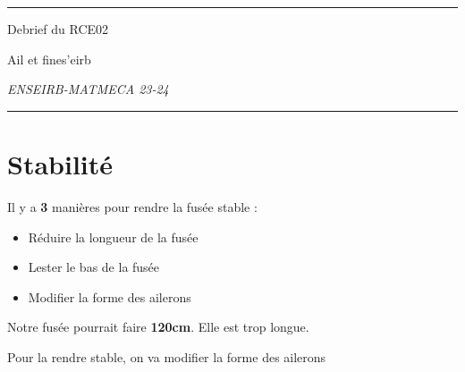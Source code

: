 \documentclass[6pt,a4paper]{article}
\begin{document}
\titlepage
\begin{center}
	\rule{\textwidth}{1pt}

	\vspace{1\baselineskip}

	\Large D\large ebrief du RCE02

	\vspace{1\baselineskip}

	\large Ail et fines'eirb

	\vspace{1\baselineskip}

	\textit{ENSEIRB-MATMECA 23-24}

	\rule{\textwidth}{1pt}
\end{center}


\newpage
\begin{center}
	\tableofcontents
\end{center}


\newpage
\section{\large Stabilité}

\vspace{1\baselineskip}

Il y a \textbf{3} manières pour rendre la fusée stable : 
\begin{itemize}
	\item Réduire la longueur de la fusée
	\item Lester le bas de la fusée
	\item Modifier la forme des ailerons
\end{itemize}

\vspace{1\baselineskip}

Notre fusée pourrait faire \textbf{120cm}. Elle est trop longue.

Pour la rendre stable, on va modifier la forme des ailerons

\vspace{1\baselineskip}
\end{document}
